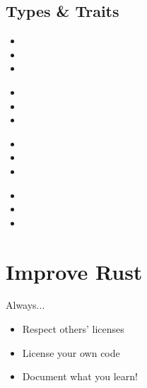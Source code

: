 \documentclass[50pt]{beamer}
\begin{document}
\subsection{Types \& Traits}

    \begin{frame}
        \begin{itemize}
            \item
            \item
            \item
        \end{itemize}
    \end{frame}


    \begin{frame}
        \begin{itemize}
            \item
            \item
            \item
        \end{itemize}
    \end{frame}

    \begin{frame}
        \begin{itemize}
            \item
            \item
            \item
        \end{itemize}
    \end{frame}


    \begin{frame}
        \begin{itemize}
            \item
            \item
            \item
        \end{itemize}
    \end{frame}

\section{Improve Rust}

    \begin{frame}
        Always...
        \begin{itemize}
            \item Respect others' licenses
            \item License your own code
            \item Document what you learn!
        \end{itemize}
    \end{frame}
\end{document}
